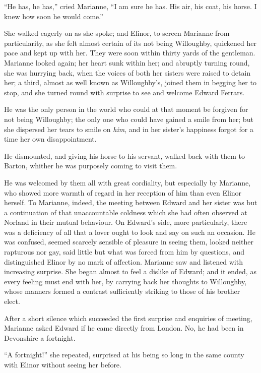 \documentclass{article}
\begin{document}
``He has, he has,'' cried Marianne, ``I am sure he has.
His air, his coat, his horse.  I knew how soon he would come.''

She walked eagerly on as she spoke; and Elinor,
to screen Marianne from particularity, as she felt almost
certain of its not being Willoughby, quickened her
pace and kept up with her.  They were soon within
thirty yards of the gentleman.  Marianne looked again;
her heart sunk within her; and abruptly turning round,
she was hurrying back, when the voices of both her sisters
were raised to detain her; a third, almost as well known
as Willoughby's, joined them in begging her to stop,
and she turned round with surprise to see and welcome
Edward Ferrars.

He was the only person in the world who could
at that moment be forgiven for not being Willoughby;
the only one who could have gained a smile from her;
but she dispersed her tears to smile on \emph{him}, and in her
sister's happiness forgot for a time her own disappointment.

He dismounted, and giving his horse to his servant,
walked back with them to Barton, whither he was purposely
coming to visit them.

He was welcomed by them all with great cordiality,
but especially by Marianne, who showed more warmth of
regard in her reception of him than even Elinor herself.
To Marianne, indeed, the meeting between Edward and her sister
was but a continuation of that unaccountable coldness which she
had often observed at Norland in their mutual behaviour.
On Edward's side, more particularly, there was a deficiency
of all that a lover ought to look and say on such an occasion.
He was confused, seemed scarcely sensible of pleasure
in seeing them, looked neither rapturous nor gay,
said little but what was forced from him by questions,
and distinguished Elinor by no mark of affection.
Marianne saw and listened with increasing surprise.
She began almost to feel a dislike of Edward; and it ended,
as every feeling must end with her, by carrying back her
thoughts to Willoughby, whose manners formed a contrast
sufficiently striking to those of his brother elect.

After a short silence which succeeded the first
surprise and enquiries of meeting, Marianne asked
Edward if he came directly from London.  No, he had
been in Devonshire a fortnight.

``A fortnight!'' she repeated, surprised at his being
so long in the same county with Elinor without seeing
her before.
\end{document}
